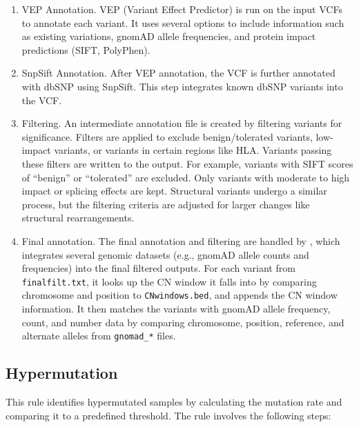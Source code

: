 \begin{enumerate}
    \item VEP Annotation. VEP (Variant Effect Predictor) is run on the input VCFs to annotate each variant. It uses several options to include information such as existing variations, gnomAD allele frequencies, and protein impact predictions (SIFT, PolyPhen).
    \item SnpSift Annotation. After VEP annotation, the VCF is further annotated with dbSNP using SnpSift. This step integrates known dbSNP variants into the VCF.
    \item Filtering. An intermediate annotation file is created by filtering variants for significance. Filters are applied to exclude benign/tolerated variants, low-impact variants, or variants in certain regions like HLA. Variants passing these filters are written to the output. For example, variants with SIFT scores of “benign” or “tolerated” are excluded. Only variants with moderate to high impact or splicing effects are kept. Structural variants undergo a similar process, but the filtering criteria are adjusted for larger changes like structural rearrangements.
    \item Final annotation. The final annotation and filtering are handled by , which integrates several genomic datasets (e.g., gnomAD allele counts and frequencies) into the final filtered outputs. For each variant from \texttt{finalfilt.txt}, it looks up the CN window it falls into by comparing chromosome and position to \texttt{CNwindows.bed}, and appends the CN window information. It then matches the variants with gnomAD allele frequency, count, and number data by comparing chromosome, position, reference, and alternate alleles from \texttt{gnomad\_*} files.
    
\end{enumerate}

\subsection{Hypermutation}

This rule identifies hypermutated samples by calculating the mutation rate and comparing it to a predefined threshold. The rule involves the following steps:

